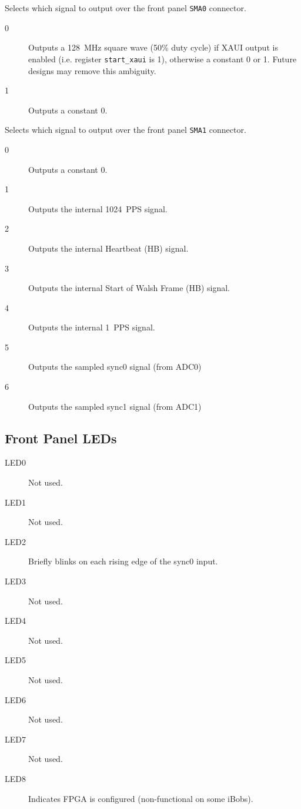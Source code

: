 \documentclass[12pt]{article}
\begin{document}
\begin{description}

 Selects which signal to output over the front panel \verb|SMA0|
connector.

\begin{description}

\item[0] Outputs a 128~MHz square wave (50\% duty cycle) if XAUI output is
enabled (i.e. register \verb|start_xaui| is 1), otherwise a constant 0 or 1.
Future designs may remove this ambiguity.

\item[1] Outputs a constant 0.

\end{description}

 Selects which signal to output over the front panel \verb|SMA1|
connector.

\begin{description}

\item[0] Outputs a constant 0.

\item[1] Outputs the internal 1024~PPS signal.

\item[2] Outputs the internal Heartbeat (HB) signal.

\item[3] Outputs the internal Start of Walsh Frame (HB) signal.

\item[4] Outputs the internal 1~PPS signal.

\item[5] Outputs the sampled sync0 signal (from ADC0)

\item[6] Outputs the sampled sync1 signal (from ADC1)

\end{description}

\end{description}

\filbreak
  \subsection{Front Panel LEDs}
\begin{description}
\item[LED0] Not used.
\item[LED1] Not used.
\item[LED2] Briefly blinks on each rising edge of the sync0 input.
\item[LED3] Not used.
\item[LED4] Not used.
\item[LED5] Not used.
\item[LED6] Not used.
\item[LED7] Not used.
\item[LED8] Indicates FPGA is configured (non-functional on some iBobs).
\end{description}
\end{document}
